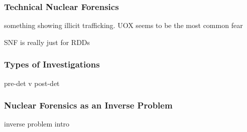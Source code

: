 

\begin{frame}
  \frametitle{Technical Nuclear Forensics}
  something showing illicit trafficking. UOX seems to be the most common fear

  SNF is really just for RDDs
\end{frame}

\begin{frame}
  \frametitle{Types of Investigations}
   pre-det v post-det
\end{frame}


\begin{frame}
  \frametitle{Nuclear Forensics as an Inverse Problem}
   inverse problem intro
\end{frame}

